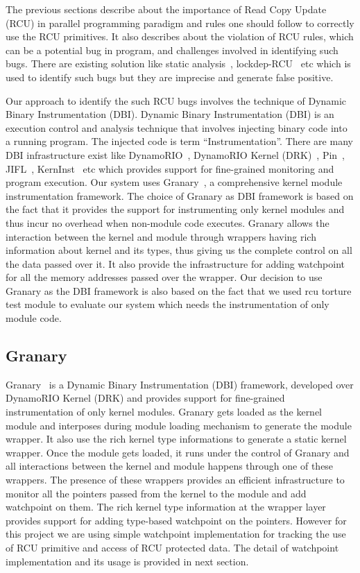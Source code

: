 The previous sections describe about the importance of Read Copy Update (RCU) in parallel programming paradigm and rules one should follow to correctly use the RCU primitives. It also describes about the violation of RCU rules, which can be a potential bug in program, and challenges involved in identifying such bugs. There are existing solution like static analysis~\cite{sparse}, lockdep-RCU~\cite{PaulEMcKenney2010LockdepRCU} etc which is used to identify such bugs but they are imprecise and generate false positive.

Our approach to identify the such RCU bugs involves the technique of Dynamic Binary Instrumentation (DBI). Dynamic Binary Instrumentation (DBI) is an execution control and analysis technique that involves injecting binary code into a running program. The injected code is term “Instrumentation”. There are many DBI infrastructure exist like DynamoRIO~\cite{Bruening04efficient}, DynamoRIO Kernel (DRK)~\cite{Feiner:2012:CKI:2150976.2150992},  Pin~\cite{Bungale:2007:PPF:1254810.1254830}, JIFL~\cite{Olszewski:2007:JIN:1272996.1273000}, KernInst~\cite{Tamches:1999:UDK:1080598.1080605} etc which provides support for fine-grained monitoring and program execution. Our system uses Granary~\cite{GranaryAtOSDI}, a comprehensive kernel module instrumentation framework. The choice of Granary as DBI framework is based on the fact that it provides the support for instrumenting only kernel modules and thus incur no overhead when non-module code executes. Granary allows the interaction between the kernel and module through wrappers having rich information about kernel and its types, thus giving us the complete control on all the data passed over it. It also provide the infrastructure for adding watchpoint for all the memory addresses passed over the wrapper. Our decision to use Granary as the DBI framework is also based on the fact that we used rcu torture test module to evaluate our system which needs the instrumentation of only module code. 


\subsection{Granary}
Granary~\cite{GranaryAtOSDI} is a Dynamic Binary Instrumentation (DBI) framework, developed over DynamoRIO Kernel (DRK) and provides support for fine-grained instrumentation of only kernel modules. Granary gets loaded as the kernel module and interposes during module loading mechanism to generate the module wrapper. It also use the rich kernel type informations to generate a static kernel wrapper. Once the module gets loaded, it runs under the control of Granary and all interactions between the kernel and module happens through one of these wrappers. The presence of these wrappers provides an efficient infrastructure to monitor all the pointers passed from the kernel to the module and add watchpoint on them. The rich kernel type information at the wrapper layer provides support for adding type-based watchpoint on the pointers. However for this project we are using simple watchpoint implementation for tracking the use of RCU primitive and access of RCU protected data. The detail of watchpoint implementation and its usage is provided in next section. 


